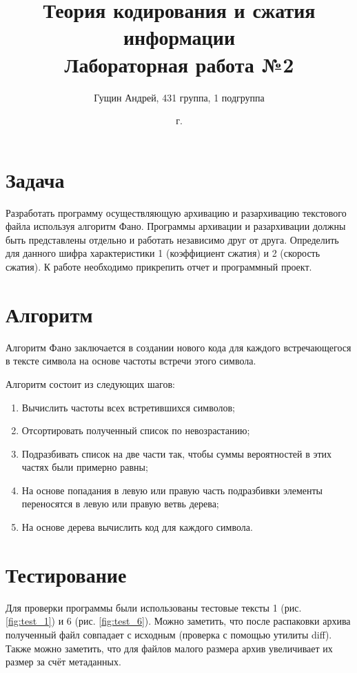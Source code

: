 \documentclass[a4paper,oneside]{article}
\title{{Теория кодирования и сжатия информации}\\{Лабораторная работа №2}}
\author{Гущин Андрей, 431 группа, 1 подгруппа}
\date{\the\year{} г.}
\theoremstyle{definition}
\begin{document}
\maketitle

\section{Задача}

Разработать программу осуществляющую архивацию и разархивацию текстового файла
используя алгоритм Фано. Программы архивации и разархивации должны быть
представлены отдельно и работать независимо друг от друга. Определить для
данного шифра характеристики 1 (коэффициент сжатия) и 2 (скорость сжатия). К
работе необходимо прикрепить отчет и программный проект.


\section{Алгоритм}

Алгоритм Фано заключается в создании нового кода для каждого встречающегося
в тексте символа на основе частоты встречи этого символа.

Алгоритм состоит из следующих шагов:
\begin{enumerate}
  \item Вычислить частоты всех встретившихся символов;
  \item Отсортировать полученный список по невозрастанию;
  \item
    Подразбивать список на две части так, чтобы суммы вероятностей в
    этих частях были примерно равны;
  \item
    На основе попадания в левую или правую часть подразбивки элементы
    переносятся в левую или правую ветвь дерева;
  \item На основе дерева вычислить код для каждого символа.
\end{enumerate}


\section{Тестирование}

Для проверки программы были использованы тестовые тексты 1 (рис.
\ref{fig:test_1}) и 6 (рис. \ref{fig:test_6}). Можно заметить,
что после распаковки архива полученный файл совпадает с исходным (проверка
с помощью утилиты diff). Также можно заметить, что для файлов малого размера
архив увеличивает их размер за счёт метаданных.
\end{document}
